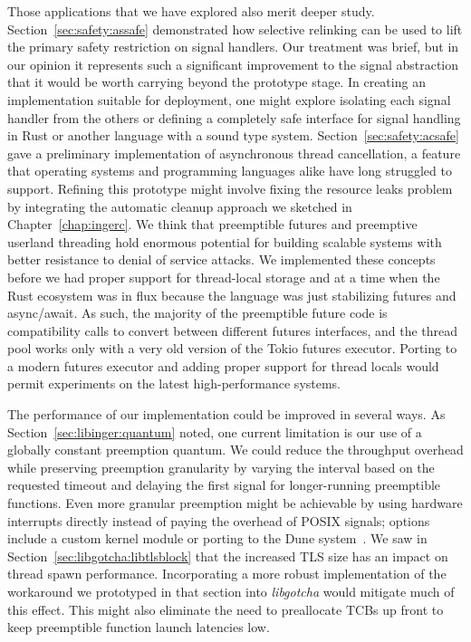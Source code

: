 Those applications that we have explored also merit deeper study.
Section~\ref{sec:safety:assafe} demonstrated how selective relinking can be used to
lift the primary safety restriction on signal handlers.  Our treatment was brief, but
in our opinion it represents such a significant improvement to the signal abstraction
that it would be worth carrying beyond the prototype stage.  In creating an
implementation suitable for deployment, one might explore isolating each signal
handler from the others or defining a completely safe interface for signal handling
in Rust or another language with a sound type system.
Section~\ref{sec:safety:acsafe} gave a preliminary implementation of asynchronous
thread cancellation, a feature that operating systems and programming languages alike
have long struggled to support.  Refining this prototype might involve fixing the
resource leaks problem by integrating the automatic cleanup approach we sketched in
Chapter~\ref{chap:ingerc}.
We think that preemptible futures and preemptive userland threading hold enormous
potential for building scalable systems with better resistance to denial of service
attacks.  We implemented these concepts before we had proper support for thread-local
storage and at a time when the Rust ecosystem was in flux because the language was
just stabilizing futures and async/await.  As such, the majority of the preemptible
future code is compatibility calls to convert between different futures interfaces,
and the thread pool works only with a very old version of the Tokio futures executor.
Porting to a modern futures executor and adding proper support for thread locals
would permit experiments on the latest high-performance systems.

The performance of our implementation could be improved in several ways.  As
Section~\ref{sec:libinger:quantum} noted, one current limitation is our use of a
globally constant preemption quantum.  We could reduce the throughput overhead while
preserving preemption granularity by varying the interval based on the requested
timeout and delaying the first signal for longer-running preemptible functions.  Even
more granular preemption might be achievable by using hardware interrupts directly
instead of paying the overhead of POSIX signals; options include a custom kernel
module or porting to the Dune system~\cite{Belay:osdi2012}.  We saw in
Section~\ref{sec:libgotcha:libtlsblock} that the increased TLS size has an impact on
thread spawn performance.  Incorporating a more robust implementation of the
workaround we prototyped in that section into \textit{libgotcha} would mitigate much
of this effect.  This might also eliminate the need to preallocate TCBs up front to
keep preemptible function launch latencies low.

